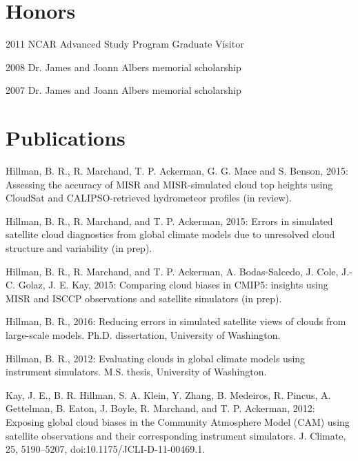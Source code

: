 \documentclass[10pt]{article}
\newenvironment{itemize*}{
   \begin{list}{}
      { 
         \setlength{\itemsep}{5pt}
         \setlength{\parsep}{0pt}
         \setlength{\topsep}{0pt}
         \setlength{\leftmargin}{0em} 
      } 
} {
   \end{list}
}
\begin{document}
\section*{Honors}
\begin{itemize*}
   \item 2011 NCAR Advanced Study Program Graduate Visitor
   \item 2008 Dr. James and Joann Albers memorial scholarship
   \item 2007 Dr. James and Joann Albers memorial scholarship
\end{itemize*}

\section*{Publications}
\begin{itemize*}
   \item Hillman, B. R., R. Marchand, T. P. Ackerman, G. G. Mace and S. Benson, 2015: Assessing the accuracy of MISR and MISR-simulated cloud top heights using CloudSat and CALIPSO-retrieved hydrometeor profiles (in review).

   \item Hillman, B. R., R. Marchand, and T. P. Ackerman, 2015: Errors in simulated satellite cloud diagnostics from global climate models due to unresolved cloud structure and variability (in prep).

   \item Hillman, B. R., R. Marchand, and T. P. Ackerman, A. Bodas-Salcedo, J. Cole, J.-C. Golaz, J. E. Kay, 2015: Comparing cloud biases in CMIP5: insights using MISR and ISCCP observations and satellite simulators (in prep).

   \item Hillman, B. R., 2016:
   Reducing errors in simulated satellite views of clouds from
   large-scale models.
   Ph.D. dissertation, University of Washington.

   \item Hillman, B. R., 2012: 
   Evaluating clouds in global climate models using instrument simulators. 
   M.S. thesis, University of Washington.

   \item Kay, J. E., B. R. Hillman, S. A. Klein, Y. Zhang, B. Medeiros,
   R. Pincus, A. Gettelman, B. Eaton, J. Boyle, R. Marchand, 
   and T. P. Ackerman,
   2012:
   Exposing global cloud biases in the Community Atmosphere Model (CAM) using 
   satellite observations and their corresponding instrument simulators. 
   J. Climate, 25, 5190–5207, doi:10.1175/JCLI-D-11-00469.1.
\end{itemize*}
\end{document}

